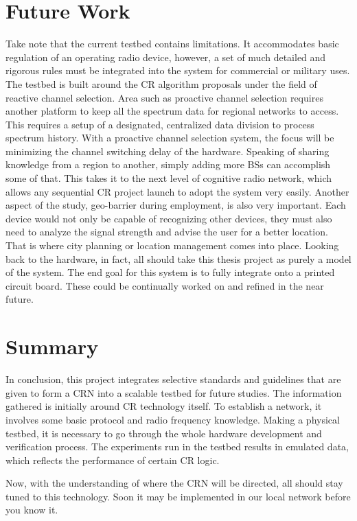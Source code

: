 \section{Future Work}
Take note that the current testbed contains limitations. It accommodates basic regulation of an operating radio device, however, a set of much detailed and rigorous rules must be integrated into the system for commercial or military uses. The testbed is built around the CR algorithm proposals under the field of reactive channel selection. Area such as proactive channel selection requires another platform to keep all the spectrum data for regional networks to access. This requires a setup of a designated, centralized data division to process spectrum history. With a proactive channel selection system, the focus will be minimizing the channel switching delay of the hardware. Speaking of sharing knowledge from a region to another, simply adding more BSs can accomplish some of that. This takes it to the next level of cognitive radio network, which allows any sequential CR project launch to adopt the system very easily. Another aspect of the study, geo-barrier during employment, is also very important. Each device would not only be capable of recognizing other devices, they must also need to analyze the signal strength and advise the user for a better location. That is where city planning or location management comes into place. Looking back to the hardware, in fact, all should take this thesis project as purely a model of the system. The end goal for this system is to fully integrate onto a printed circuit board. These could be continually worked on and refined in the near future. 

\section{Summary}
In conclusion, this project integrates selective standards and guidelines that are given to form a CRN into a scalable testbed for future studies. The information gathered is initially around CR technology itself. To establish a network, it involves some basic protocol and radio frequency knowledge. Making a physical testbed, it is necessary to go through the whole hardware development and verification process. The experiments run in the testbed results in emulated data, which reflects the performance of certain CR logic. 

Now, with the understanding of where the CRN will be directed, all should stay tuned to this technology. Soon it may be implemented in our local network before you know it.
